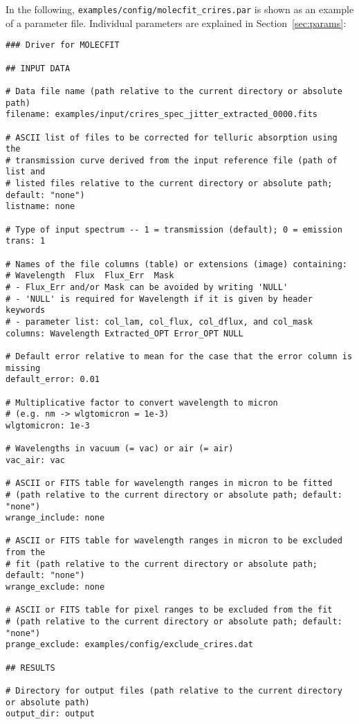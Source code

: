 In the following, {\tt examples/config/molecfit\_crires.par} is shown as
an example of a parameter file. Individual parameters are explained in
Section~\ref{sec:params}:

{\small
\begin{verbatim}
### Driver for MOLECFIT

## INPUT DATA

# Data file name (path relative to the current directory or absolute path)
filename: examples/input/crires_spec_jitter_extracted_0000.fits

# ASCII list of files to be corrected for telluric absorption using the
# transmission curve derived from the input reference file (path of list and
# listed files relative to the current directory or absolute path; default: "none")
listname: none

# Type of input spectrum -- 1 = transmission (default); 0 = emission
trans: 1

# Names of the file columns (table) or extensions (image) containing:
# Wavelength  Flux  Flux_Err  Mask
# - Flux_Err and/or Mask can be avoided by writing 'NULL'
# - 'NULL' is required for Wavelength if it is given by header keywords
# - parameter list: col_lam, col_flux, col_dflux, and col_mask
columns: Wavelength Extracted_OPT Error_OPT NULL

# Default error relative to mean for the case that the error column is missing
default_error: 0.01

# Multiplicative factor to convert wavelength to micron
# (e.g. nm -> wlgtomicron = 1e-3)
wlgtomicron: 1e-3

# Wavelengths in vacuum (= vac) or air (= air)
vac_air: vac

# ASCII or FITS table for wavelength ranges in micron to be fitted
# (path relative to the current directory or absolute path; default: "none")
wrange_include: none

# ASCII or FITS table for wavelength ranges in micron to be excluded from the
# fit (path relative to the current directory or absolute path; default: "none")
wrange_exclude: none

# ASCII or FITS table for pixel ranges to be excluded from the fit
# (path relative to the current directory or absolute path; default: "none")
prange_exclude: examples/config/exclude_crires.dat

## RESULTS

# Directory for output files (path relative to the current directory or absolute path)
output_dir: output


\end{verbatim}}
